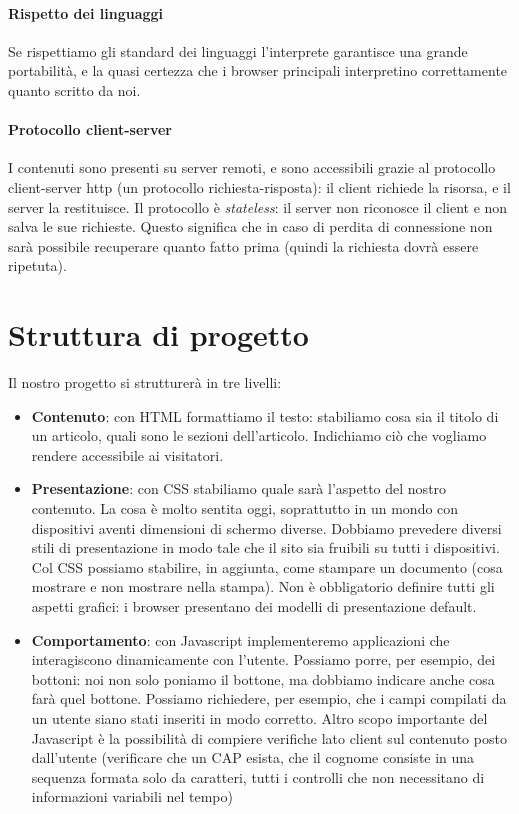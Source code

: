 \documentclass[11pt]{report}
\begin{document}
\paragraph{Rispetto dei linguaggi} Se rispettiamo gli standard dei linguaggi l'interprete garantisce una grande portabilità, e la quasi certezza che i browser principali interpretino correttamente quanto scritto da noi.

\paragraph{Protocollo client-server} I contenuti sono presenti su server remoti, e sono accessibili grazie al protocollo client-server http (un protocollo richiesta-risposta): il client richiede la risorsa, e il server la restituisce. Il protocollo è \emph{stateless}: il server non riconosce il client e non salva le sue richieste. Questo significa che in caso di perdita di connessione non sarà possibile recuperare quanto fatto prima (quindi la richiesta dovrà essere ripetuta).

\section*{Struttura di progetto}
Il nostro progetto si strutturerà in tre livelli:
\begin{itemize}
\item \textbf{Contenuto}: con HTML formattiamo il testo: stabiliamo cosa sia il titolo di un articolo, quali sono le sezioni dell'articolo. Indichiamo ciò che vogliamo rendere accessibile ai visitatori.
\item \textbf{Presentazione}: con CSS stabiliamo quale sarà l'aspetto del nostro contenuto. La cosa è molto sentita oggi, soprattutto in un mondo con dispositivi aventi dimensioni di schermo diverse. Dobbiamo prevedere diversi stili di presentazione in modo tale che il sito sia fruibili su tutti i dispositivi. Col CSS possiamo stabilire, in aggiunta, come stampare un documento (cosa mostrare e non mostrare nella stampa). Non è obbligatorio definire tutti gli aspetti grafici: i browser presentano dei modelli di presentazione default.
\item \textbf{Comportamento}: con Javascript implementeremo applicazioni che interagiscono dinamicamente con l'utente. Possiamo porre, per esempio, dei bottoni: noi non solo poniamo il bottone, ma dobbiamo indicare anche cosa farà quel bottone. Possiamo richiedere, per esempio, che i campi compilati da un utente siano stati inseriti in modo corretto. Altro scopo importante del Javascript è la possibilità di compiere verifiche lato client sul contenuto posto dall'utente (verificare che un CAP esista, che il cognome consiste in una sequenza formata solo da caratteri, tutti i controlli che non necessitano di informazioni variabili nel tempo)
\end{itemize}
\end{document}
